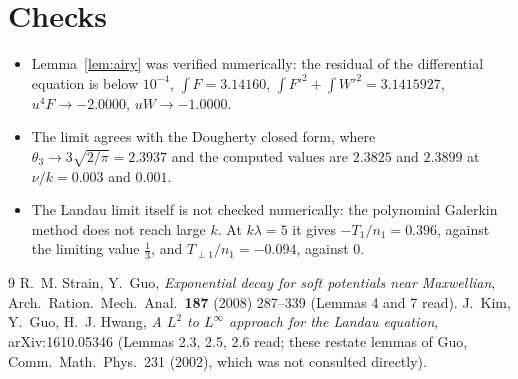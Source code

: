\documentclass[11pt]{article}
\theoremstyle{remark}
\begin{document}
\section{Checks}

\begin{itemize}
  \item Lemma~\ref{lem:airy} was verified numerically: the residual of the
    differential equation is below $10^{-4}$, $\int F=3.14160$,
    $\int F'^2+\int W'^2=3.1415927$, $u^4F\to-2.0000$, $uW\to-1.0000$.
  \item The limit agrees with the Dougherty closed form, where
    $\theta_3\to3\sqrt{2/\pi}=2.3937$ and the computed values are $2.3825$
    and $2.3899$ at $\nu/k=0.003$ and $0.001$.
  \item The Landau limit itself is not checked numerically: the polynomial
    Galerkin method does not reach large $k$. At $k\lambda=5$ it gives
    $-T_1/n_1=0.396$, against the limiting value $\tfrac13$, and
    $T_{\perp1}/n_1=-0.094$, against $0$.
\end{itemize}

\begin{thebibliography}{9}
 R.~M. Strain, Y.~Guo, \emph{Exponential decay for soft
potentials near Maxwellian}, Arch.\ Ration.\ Mech.\ Anal.\ \textbf{187}
(2008) 287--339 (Lemmas 4 and 7 read).
 J.~Kim, Y.~Guo, H.~J. Hwang, \emph{A $L^2$ to $L^\infty$
approach for the Landau equation}, arXiv:1610.05346 (Lemmas 2.3, 2.5, 2.6
read; these restate lemmas of Guo, Comm.\ Math.\ Phys.\ 231 (2002), which was
not consulted directly).
\end{thebibliography}
\end{document}
